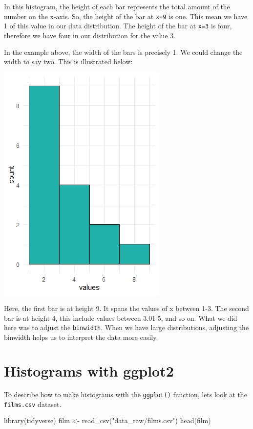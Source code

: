 \documentclass[
  letterpaper,
  DIV=11,
  numbers=noendperiod]{scrreprt}
\newenvironment{Shaded}{\begin{snugshade}}{\end{snugshade}}
\newcommand{\FunctionTok}[1]{\textcolor[rgb]{0.28,0.35,0.67}{#1}}
\newcommand{\NormalTok}[1]{\textcolor[rgb]{0.00,0.23,0.31}{#1}}
\newcommand{\OtherTok}[1]{\textcolor[rgb]{0.00,0.23,0.31}{#1}}
\newcommand{\StringTok}[1]{\textcolor[rgb]{0.13,0.47,0.30}{#1}}
\begin{document}
In this histogram, the height of each bar represents the total amount of
the number on the x-axis. So, the height of the bar at \texttt{x=9} is
one. This mean we have 1 of this value in our data distribution. The
height of the bar at \texttt{x=3} is four, therefore we have four in our
distribution for the value 3.

In the example above, the width of the bars is precisely 1. We could
change the width to say two. This is illustrated below:

\includegraphics{./img/hist2.png}

Here, the first bar is at height 9. It spans the values of x between
1-3. The second bar is at height 4, this include values between 3.01-5,
and so on. What we did here was to adjust the \texttt{binwidth}. When we
have large distributions, adjusting the binwidth helps us to interpret
the data more easily.

\hypertarget{histograms-with-ggplot2}{%
\section{Histograms with ggplot2}\label{histograms-with-ggplot2}}

To describe how to make histograms with the \texttt{ggplot()} function,
lets look at the \texttt{films.csv} dataset.

\begin{Shaded}
\begin{Highlighting}[]
\FunctionTok{library}\NormalTok{(tidyverse)}
\NormalTok{film }\OtherTok{\textless{}{-}} \FunctionTok{read\_csv}\NormalTok{(}\StringTok{"data\_raw/films.csv"}\NormalTok{)}
\FunctionTok{head}\NormalTok{(film)}
\end{Highlighting}
\end{Shaded}
\end{document}
